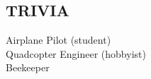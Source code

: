\documentclass[margin,4pt]{res} %
\begin{document}
\begin{resume}
\section{TRIVIA}  
	Airplane Pilot (student)\\
	Quadcopter Engineer (hobbyist)\\
	Beekeeper\\


\end{resume}
\end{document}
